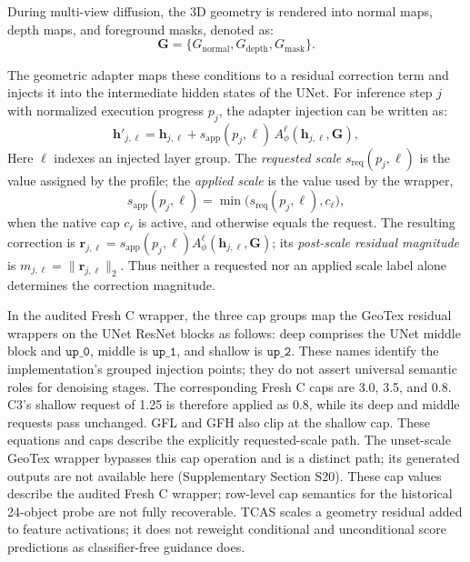 \documentclass[times,twocolumn,final]{elsarticle}
\begin{document}
During multi-view diffusion, the 3D geometry is rendered into normal maps, depth maps, and foreground masks, denoted as:
\begin{equation}
\mathbf{G} = \{G_\text{normal}, G_\text{depth}, G_\text{mask}\}.
\end{equation}

The geometric adapter maps these conditions to a residual correction term and injects it into the intermediate hidden states of the UNet. For inference step $j$ with normalized execution progress $p_j$, the adapter injection can be written as:
\begin{equation}
\mathbf{h}'_{j,\ell} = \mathbf{h}_{j,\ell} + s_{\mathrm{app}}(p_j,\ell)\, A^\ell_\phi(\mathbf{h}_{j,\ell}, \mathbf{G}),
\label{eq:injection}
\end{equation}
Here $\ell$ indexes an injected layer group. The \emph{requested scale} $s_{\mathrm{req}}(p_j,\ell)$ is the value assigned by the profile; the \emph{applied scale} is the value used by the wrapper,
\begin{equation}
s_{\mathrm{app}}(p_j,\ell)=\min\!\bigl(s_{\mathrm{req}}(p_j,\ell),c_\ell\bigr),
\end{equation}
when the native cap $c_\ell$ is active, and otherwise equals the request. The resulting correction is $\mathbf{r}_{j,\ell}=s_{\mathrm{app}}(p_j,\ell)A^\ell_\phi(\mathbf{h}_{j,\ell},\mathbf{G})$; its \emph{post-scale residual magnitude} is $m_{j,\ell}=\|\mathbf{r}_{j,\ell}\|_2$. Thus neither a requested nor an applied scale label alone determines the correction magnitude.

In the audited Fresh C wrapper, the three cap groups map the GeoTex residual wrappers on the UNet ResNet blocks as follows: deep comprises the UNet middle block and $\texttt{up\_0}$, middle is $\texttt{up\_1}$, and shallow is $\texttt{up\_2}$. These names identify the implementation's grouped injection points; they do not assert universal semantic roles for denoising stages. The corresponding Fresh C caps are 3.0, 3.5, and 0.8. C3's shallow request of 1.25 is therefore applied as 0.8, while its deep and middle requests pass unchanged. GFL and GFH also clip at the shallow cap. These equations and caps describe the explicitly requested-scale path. The unset-scale GeoTex wrapper bypasses this cap operation and is a distinct path; its generated outputs are not available here (Supplementary Section S20). These cap values describe the audited Fresh C wrapper; row-level cap semantics for the historical 24-object probe are not fully recoverable. TCAS scales a geometry residual added to feature activations; it does not reweight conditional and unconditional score predictions as classifier-free guidance does.
\end{document}
